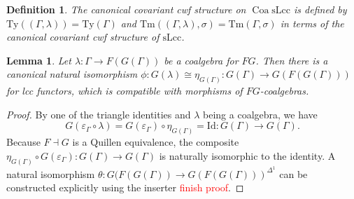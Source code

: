 \documentclass{article}
\newcommand{\todo}[1]{\textcolor{red}{#1}}
\newtheorem{lemma}{Lemma}
\newtheorem{definition}{Definition}
\begin{document}
\begin{definition}
  The canonical covariant cwf structure on $\operatorname{Coa} \mathrm{sLcc}$ is defined by $\mathrm{Ty}((\Gamma, \lambda)) = \mathrm{Ty}(\Gamma)$ and $\mathrm{Tm}((\Gamma, \lambda), \sigma) = \mathrm{Tm}(\Gamma, \sigma)$ in terms of the canonical covariant cwf structure of $\mathrm{sLcc}$.
\end{definition}

\begin{lemma}
  Let $\lambda : \Gamma \rightarrow F(G(\Gamma))$ be a coalgebra for $FG$.
  Then there is a canonical natural isomorphism $\phi : G(\lambda) \cong \eta_{G(\Gamma)} : G(\Gamma) \rightarrow G(F(G(\Gamma)))$ for lcc functors, which is compatible with morphisms of $FG$-coalgebras.
\end{lemma}
\begin{proof}
  By one of the triangle identities and $\lambda$ being a coalgebra, we have
  \begin{equation}
    G(\varepsilon_\Gamma \circ \lambda) = G(\varepsilon_\Gamma) \circ \eta_{G(\Gamma)} = \mathrm{Id} : G(\Gamma) \rightarrow G(\Gamma).
  \end{equation}
  Because $F \dashv G$ is a Quillen equivalence, the composite $\eta_{G(\Gamma)} \circ G(\varepsilon_\Gamma) : G(\Gamma) \rightarrow G(\Gamma)$ is naturally isomorphic to the identity.
  A natural isomorphism $\theta : G(F(G(\Gamma)) \rightarrow G(F(G(\Gamma)))^{\Delta^1}$ can be constructed explicitly using the inserter \todo{finish proof}.
\end{proof}
\end{document}

